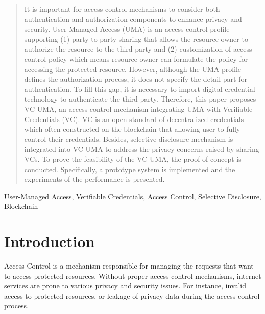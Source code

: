 \documentclass[conference, dvipdfmx]{IEEEtran} %
\begin{document}
\begin{sloppypar}
\maketitle

\begin{abstract}
    It is important for access control mechanisms to consider both authentication and authorization components to enhance privacy and security. User-Managed Access (UMA) is an access control profile supporting (1) party-to-party sharing that allows the resource owner to authorize the resource to the third-party and (2) customization of access control policy which means resource owner can formulate the policy for accessing the protected resource. However, although the UMA profile defines the authorization process, it does not specify the detail part for authentication. To fill this gap, it is necessary to import digital credential technology to authenticate the third party. Therefore, this paper proposes VC-UMA, an access control mechanism integrating UMA with Verifiable Credentials (VC). VC is an open standard of decentralized credentials which often constructed on the blockchain that allowing user to fully control their credentials.  Besides, selective disclosure mechanism is integrated into VC-UMA to address the privacy concerns raised by sharing VCs. To prove the feasibility of the VC-UMA, the proof of concept is conducted. Specifically, a prototype system is implemented and the experiments of the performance is presented. 
\end{abstract}

\begin{IEEEkeywords}
    User-Managed Access, Verifiable Credentials, Access Control, Selective Disclosure, Blockchain
\end{IEEEkeywords}

\section{Introduction}

Access Control\cite{AccessControl1} is a mechanism responsible for managing the requests that want to access protected resources. Without proper access control mechanisms, internet services are prone to various privacy and security issues. For instance, invalid access to protected resources, or leakage of privacy data during the access control process.


\end{sloppypar}
\end{document}
